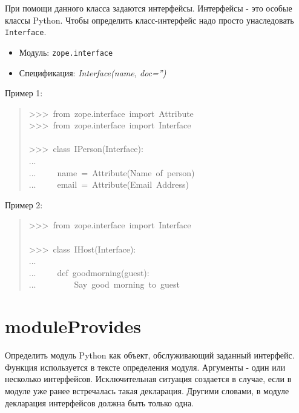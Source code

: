 \documentclass[14pt,a4paper,openany,twoside,final]{extbook}
\providecommand*{\DUroletitlereference}[1]{\textsl{#1}}
\begin{document}
При помощи данного класса задаются интерфейсы. Интерфейсы - это особые
классы Python.  Чтобы определить класс-интерфейс надо просто
унаследовать \texttt{Interface}.

\begin{itemize}

\item Модуль: \texttt{zope.interface}

\item Спецификация: \DUroletitlereference{Interface(name, doc='')}

\end{itemize}

Пример 1:

\begin{quote}{\ttfamily \raggedright \noindent
>{}>{}>~from~zope.interface~import~Attribute\\
>{}>{}>~from~zope.interface~import~Interface\\
~\\
>{}>{}>~class~IPerson(Interface):\\
...\\
...~~~~~name~=~Attribute(\textquotedbl{}Name~of~person\textquotedbl{})\\
...~~~~~email~=~Attribute(\textquotedbl{}Email~Address\textquotedbl{})
}
\end{quote}

Пример 2:

\begin{quote}{\ttfamily \raggedright \noindent
>{}>{}>~from~zope.interface~import~Interface\\
~\\
>{}>{}>~class~IHost(Interface):\\
...\\
...~~~~~def~goodmorning(guest):\\
...~~~~~~~~~\textquotedbl{}\textquotedbl{}\textquotedbl{}Say~good~morning~to~guest\textquotedbl{}\textquotedbl{}\textquotedbl{}
}
\end{quote}


\section*{moduleProvides%
  \label{moduleprovides}%
}

Определить модуль Python как объект, обслуживающий заданный интерфейс.
Функция используется в тексте определения модуля.  Аргументы - один
или несколько интерфейсов.  Исключительная ситуация создается в
случае, если в модуле уже ранее встречалась такая декларация.  Другими
словами, в модуле декларация интерфейсов должна быть только одна.
\end{document}
